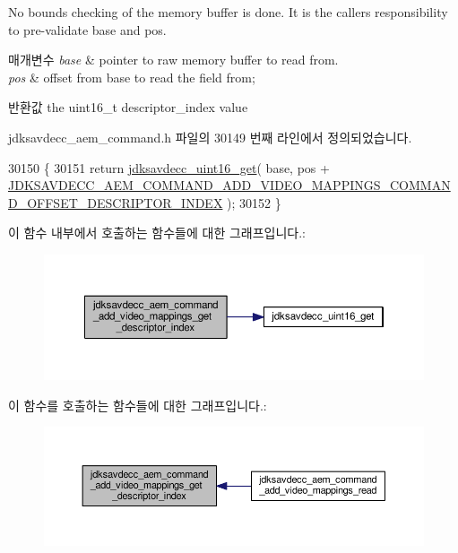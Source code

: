 No bounds checking of the memory buffer is done. It is the caller\textquotesingle{}s responsibility to pre-\/validate base and pos.


\begin{DoxyParams}{매개변수}
{\em base} & pointer to raw memory buffer to read from. \\
\hline
{\em pos} & offset from base to read the field from; \\
\hline
\end{DoxyParams}
\begin{DoxyReturn}{반환값}
the uint16\+\_\+t descriptor\+\_\+index value 
\end{DoxyReturn}


jdksavdecc\+\_\+aem\+\_\+command.\+h 파일의 30149 번째 라인에서 정의되었습니다.


\begin{DoxyCode}
30150 \{
30151     \textcolor{keywordflow}{return} \hyperlink{group__endian_ga3fbbbc20be954aa61e039872965b0dc9}{jdksavdecc\_uint16\_get}( base, pos + 
      \hyperlink{group__command__add__video__mappings_ga7bd69550105c23a44b90d7f22ea0c945}{JDKSAVDECC\_AEM\_COMMAND\_ADD\_VIDEO\_MAPPINGS\_COMMAND\_OFFSET\_DESCRIPTOR\_INDEX}
       );
30152 \}
\end{DoxyCode}


이 함수 내부에서 호출하는 함수들에 대한 그래프입니다.\+:
\nopagebreak
\begin{figure}[H]
\begin{center}
\leavevmode
\includegraphics[width=350pt]{group__command__add__video__mappings_ga316f8320076daad302b46eeb0f2051eb_cgraph}
\end{center}
\end{figure}




이 함수를 호출하는 함수들에 대한 그래프입니다.\+:
\nopagebreak
\begin{figure}[H]
\begin{center}
\leavevmode
\includegraphics[width=350pt]{group__command__add__video__mappings_ga316f8320076daad302b46eeb0f2051eb_icgraph}
\end{center}
\end{figure}


